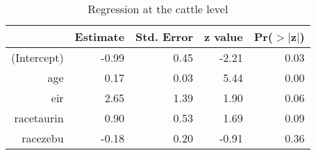\begin{table}[ht]
\centering
\caption{Regression at the cattle level} 
\begin{tabular}{rrrrr}
  \hline
 & Estimate & Std. Error & z value & Pr($>$$|$z$|$) \\ 
  \hline
(Intercept) & -0.99 & 0.45 & -2.21 & 0.03 \\ 
  age & 0.17 & 0.03 & 5.44 & 0.00 \\ 
  eir & 2.65 & 1.39 & 1.90 & 0.06 \\ 
  racetaurin & 0.90 & 0.53 & 1.69 & 0.09 \\ 
  racezebu & -0.18 & 0.20 & -0.91 & 0.36 \\ 
   \hline
\end{tabular}
\end{table}
